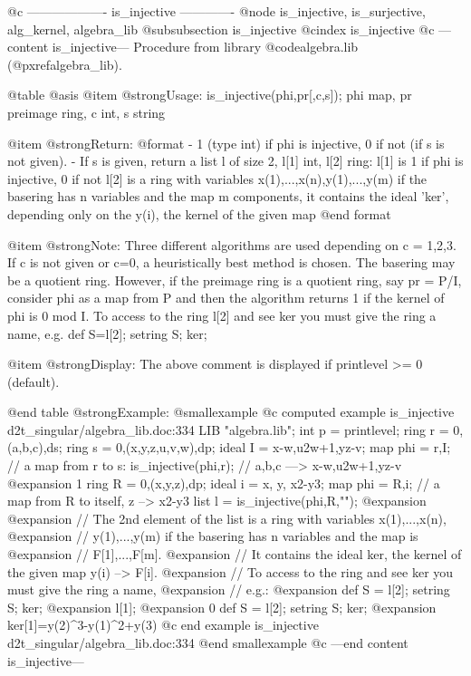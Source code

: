 @c ------------------- is_injective -------------
@node is_injective, is_surjective, alg_kernel, algebra_lib
@subsubsection is_injective
@cindex is_injective
@c ---content is_injective---
Procedure from library @code{algebra.lib} (@pxref{algebra_lib}).

@table @asis
@item @strong{Usage:}
is_injective(phi,pr[,c,s]); phi map, pr preimage ring, c int, s string

@item @strong{Return:}
@format	
         - 1 (type int) if phi is injective, 0 if not (if s is not given).
         - If s is given, return a list l of size 2, l[1] int, l[2] ring:
           l[1] is 1 if phi is injective, 0 if not
           l[2] is a ring with variables x(1),...,x(n),y(1),...,y(m) if the
           basering has n variables and the map m components, it contains the
           ideal 'ker', depending only on the y(i), the kernel of the given map
@end format

@item @strong{Note:}
Three different algorithms are used depending on c = 1,2,3.
If c is not given or c=0, a heuristically best method is chosen.
The basering may be a quotient ring. However, if the preimage ring is
a quotient ring, say pr = P/I, consider phi as a map from P and then
the algorithm returns 1 if the kernel of phi is 0 mod I.
To access to the ring l[2] and see ker you must give the ring a name,
e.g. def S=l[2]; setring S; ker;

@item @strong{Display:}
The above comment is displayed if printlevel >= 0 (default).

@end table
@strong{Example:}
@smallexample
@c computed example is_injective d2t_singular/algebra_lib.doc:334 
LIB "algebra.lib";
int p = printlevel;
ring r = 0,(a,b,c),ds;
ring s = 0,(x,y,z,u,v,w),dp;
ideal I = x-w,u2w+1,yz-v;
map phi = r,I;                    // a map from r to s:
is_injective(phi,r);              // a,b,c ---> x-w,u2w+1,yz-v
@expansion{} 1
ring R = 0,(x,y,z),dp;
ideal i = x, y, x2-y3;
map phi = R,i;                    // a map from R to itself, z --> x2-y3
list l = is_injective(phi,R,"");
@expansion{} 
@expansion{} // The 2nd element of the list is a ring with variables x(1),...,x(n),
@expansion{} // y(1),...,y(m) if the basering has n variables and the map is
@expansion{} // F[1],...,F[m].
@expansion{} // It contains the ideal ker, the kernel of the given map y(i) --> F[i].
@expansion{} // To access to the ring and see ker you must give the ring a name,
@expansion{} // e.g.:
@expansion{}      def S = l[2]; setring S; ker;
@expansion{} 	
l[1];
@expansion{} 0
def S = l[2]; setring S;
ker;
@expansion{} ker[1]=y(2)^3-y(1)^2+y(3)
@c end example is_injective d2t_singular/algebra_lib.doc:334
@end smallexample
@c ---end content is_injective---

